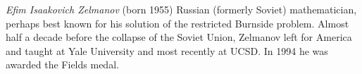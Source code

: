 \documentclass[12pt]{article}
\begin{document}
\emph{Efim Isaakovich Zelmanov} (born 1955) Russian (formerly Soviet) mathematician, perhaps best known for his solution of the restricted Burnside problem. Almost half a decade before the collapse of the Soviet Union, Zelmanov left for America and taught at Yale University and most recently at UCSD. In 1994 he was awarded the Fields medal.
\end{document}
